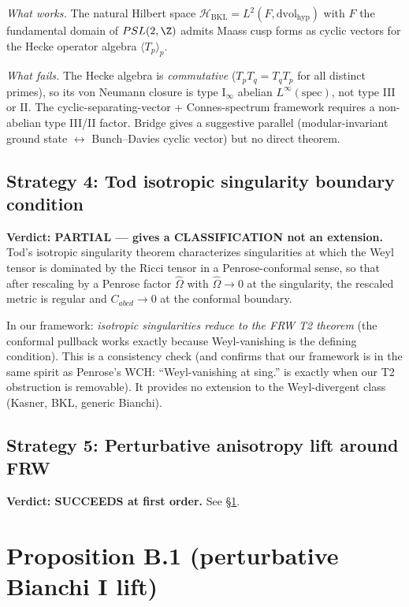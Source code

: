 \documentclass[11pt]{article}
\theoremstyle{definition}
\newcommand{\HH}{\mathcal{H}}
\newcommand{\BKL}{\mathrm{BKL}}
\begin{document}
\smallskip\noindent\emph{What works.}
The natural Hilbert space $\HH_\BKL = L^2(F, \mathrm{dvol}_\mathrm{hyp})$
with $F$ the fundamental domain of $PSL(2,\Z)$ admits Maass cusp forms
as cyclic vectors for the Hecke operator algebra
$\langle T_p\rangle_p$.

\smallskip\noindent\emph{What fails.}
The Hecke algebra is \emph{commutative} ($T_p T_q = T_q T_p$ for all
distinct primes), so its von Neumann closure is type I$_\infty$
abelian $L^\infty(\mathrm{spec})$, not type III or II. The
cyclic-separating-vector + Connes-spectrum framework requires a
non-abelian type III/II factor. Bridge gives a suggestive parallel
(modular-invariant ground state $\leftrightarrow$ Bunch--Davies cyclic
vector) but no direct theorem.

\subsection{Strategy 4: Tod isotropic singularity boundary condition}

\textbf{Verdict: PARTIAL --- gives a CLASSIFICATION not an extension.}
Tod's isotropic singularity theorem \cite{Tod1991, GoodeWainwright1985}
characterizes singularities at which the Weyl tensor is dominated by the
Ricci tensor in a Penrose-conformal sense, so that after rescaling by a
Penrose factor $\widehat\Omega$ with $\widehat\Omega \to 0$ at the
singularity, the rescaled metric is regular and $C_{abcd}\to 0$ at the
conformal boundary.

In our framework: \emph{isotropic singularities reduce to the FRW T2
theorem} (the conformal pullback works exactly because Weyl-vanishing
is the defining condition). This is a consistency check (and confirms
that our framework is in the same spirit as Penrose's WCH:
``Weyl-vanishing at sing.'' is exactly when our T2 obstruction is
removable). It provides no extension to the Weyl-divergent class
(Kasner, BKL, generic Bianchi).

\subsection{Strategy 5: Perturbative anisotropy lift around FRW}

\textbf{Verdict: SUCCEEDS at first order.} See \S\ref{sec:propB1}.

\section{Proposition B.1 (perturbative Bianchi I lift)}\label{sec:propB1}
\end{document}

